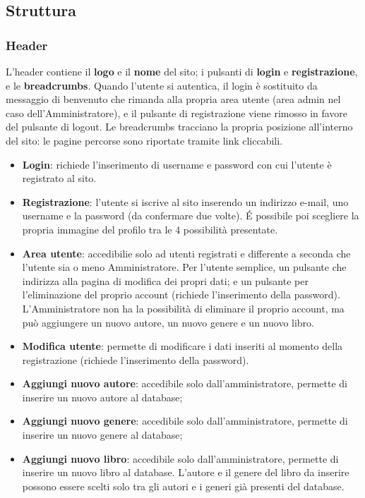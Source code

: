 \documentclass[12pt,a4paper,headings=optiontohead]{article}
\begin{document}
	
	\newpage
	\subsection{Struttura}
	
	
	\subsubsection{Header}
	
	L'header contiene il \textbf{logo} e il \textbf{nome} del sito; i pulsanti di \textbf{login} e \textbf{registrazione}, e le \textbf{breadcrumbs}. 
	Quando l'utente si autentica, il login è sostituito da messaggio di benvenuto che rimanda alla propria area utente (area admin nel caso dell'Amministratore), e il pulsante di registrazione viene rimosso in favore del pulsante di logout.
	Le breadcrumbs tracciano la propria posizione all'interno del sito: le pagine percorse sono riportate tramite link cliccabili. 
	\begin{itemize}
		\item \textbf{Login}: richiede l'inserimento di username e password con cui l'utente è registrato al sito.
		\item \textbf{Registrazione}: l'utente si iscrive al sito inserendo un indirizzo e-mail, uno username e la password (da confermare due volte). \'E possibile poi scegliere la propria immagine del profilo tra le 4 possibilità presentate.
		\item \textbf{Area utente}: accedibilie solo ad utenti registrati e differente a seconda che l'utente sia o meno Amministratore. Per l'utente semplice, un pulsante che indirizza alla pagina di modifica dei propri dati; e un pulsante per l'eliminazione del proprio account (richiede l'inserimento della password). L'Amministratore non ha la possibilità di eliminare il proprio account, ma può aggiungere un nuovo autore, un nuovo genere e un nuovo libro.
		\item \textbf{Modifica utente}: permette di modificare i dati inseriti al momento della registrazione (richiede l'inserimento della password).
		\item \textbf{Aggiungi nuovo autore}: accedibile solo dall'amministratore, permette di inserire un nuovo autore al database; 
		\item \textbf{Aggiungi nuovo genere}: accedibile solo dall'amministratore, permette di inserire un nuovo genere al database; 
		\item \textbf{Aggiungi nuovo libro}: accedibile solo dall'amministratore, permette di inserire un nuovo libro al database. L'autore e il genere del libro da inserire possono essere scelti solo tra gli autori e i generi già presenti del database.
	\end{itemize}
	
\end{document}
